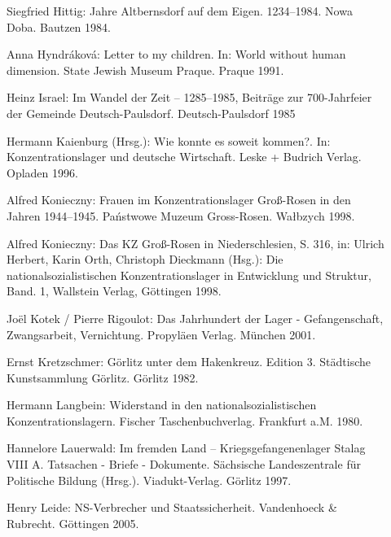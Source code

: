 \documentclass[a4paper,12pt,ngerman,
]{nisebook}
\begin{document}
\begin{description}
\item[]{Siegfried Hittig:  Jahre Altbernsdorf auf dem Eigen. 1234--1984\grqq. Nowa Doba. Bautzen 1984.}

\item[]{Anna Hyndr\'akov\'a: \glqq Letter to my children\grqq. In: \glqq World without human dimension\grqq. State Jewish Museum Praque. Praque 1991.}

\item[]{Heinz Israel: \glqq Im Wandel der Zeit -- 1285--1985, Beiträge zur 700-Jahrfeier der Gemeinde Deutsch-Paulsdorf\grqq. Deutsch-Paulsdorf 1985}

\item[]{Hermann Kaienburg (Hrsg.): \glqq Wie konnte es soweit kommen?\grqq. In: \glqq Konzentrationslager und deutsche Wirtschaft\grqq. Leske + Budrich Verlag. Opladen 1996.}

\item[]{Alfred Konieczny: \glqq Frauen im Konzentrationslager Groß-Rosen in den Jahren 1944--1945\grqq. Państwowe Muzeum Gross-Rosen. Wa\l bzych 1998.} 

\item[]{Alfred Konieczny: \glqq Das KZ Groß-Rosen in Niederschlesien\grqq, S. 316, in: Ulrich Herbert, Karin Orth, Christoph Dieckmann (Hsg.): \glqq Die nationalsozialistischen Konzentrationslager in Entwicklung und Struktur, Band. 1\grqq, Wallstein Verlag, Göttingen 1998.}

\item[]{Jo\"el Kotek / Pierre Rigoulot: \glqq Das Jahrhundert der Lager - Gefangenschaft, Zwangsarbeit, Vernichtung\grqq. Propyläen Verlag. München 2001.}

\item[]{Ernst Kretzschmer: \glqq Görlitz unter dem Hakenkreuz\grqq. Edition 3. Städtische Kunstsammlung Görlitz. Görlitz 1982. }

\item[]{Hermann Langbein: \glqq Widerstand in den nationalsozialistischen Konzentrationslagern\grqq. Fischer Taschenbuchverlag. Frankfurt a.M. 1980.}

\item[]{Hannelore Lauerwald: \glqq Im fremden Land -- Kriegsgefangenenlager Stalag VIII A. Tatsachen - Briefe - Dokumente\grqq. Sächsische Landeszentrale für Politische Bildung (Hrsg.). Viadukt-Verlag. Görlitz 1997.}

\item[]{Henry Leide: \glqq NS-Verbrecher und Staatssicherheit\grqq. Vandenhoeck \& Rubrecht. Göttingen 2005. }


\end{description}
\end{document}
